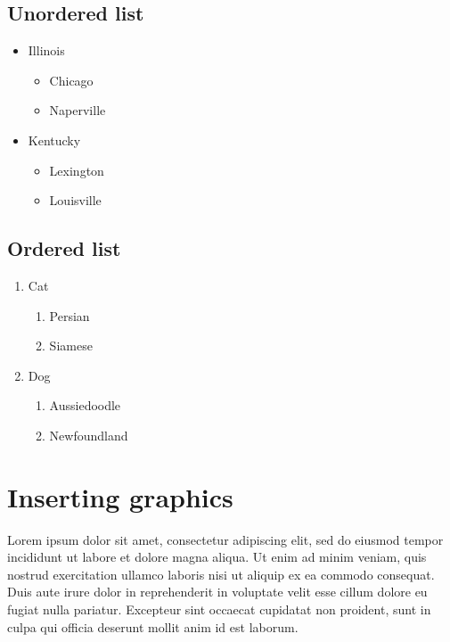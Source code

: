\documentclass[10pt, letterpaper, twoside]{article}
\begin{document}
\subsection{Unordered list}\label{sec:unordered_list}
\begin{itemize}
    \item Illinois
        \begin{itemize} \item Chicago \item Naperville \end{itemize}
    \item Kentucky
        \begin{itemize} \item Lexington \item Louisville \end{itemize}
\end{itemize}

\subsection{Ordered list}\label{sec:ordered_list}
\begin{enumerate}
    \item Cat
        \begin{enumerate}
            \item Persian
            \item Siamese
        \end{enumerate}
    \item Dog
        \begin{enumerate}
            \item Aussiedoodle
            \item Newfoundland
        \end{enumerate}
\end{enumerate}

\newpage
\section{Inserting graphics}\label{sec:graphics}
Lorem ipsum dolor sit amet, consectetur adipiscing elit, sed do eiusmod tempor incididunt ut labore et dolore magna aliqua. Ut enim ad minim veniam, quis nostrud exercitation ullamco laboris nisi ut aliquip ex ea commodo consequat. Duis aute irure dolor in reprehenderit in voluptate velit esse cillum dolore eu fugiat nulla pariatur. Excepteur sint occaecat cupidatat non proident, sunt in culpa qui officia deserunt mollit anim id est laborum.
\end{document}
